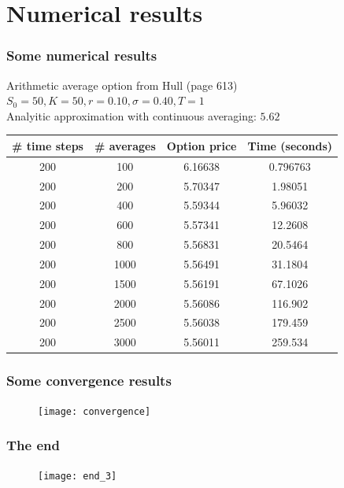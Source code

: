 \documentclass{beamer}
\begin{document}
\section{Numerical results}

\begin{frame}
\frametitle{Some numerical results}
\begin{center}
Arithmetic average option from Hull (page 613)\\
$S_0=50, K = 50, r = 0.10, \sigma = 0.40, T = 1$ \\
Analyitic approximation with continuous averaging: $5.62$
\end{center}

\begin{table}
\begin{tabular}{c c c c}
\toprule
\textbf{\# time steps} & \textbf{\# averages} & \textbf{Option price} & \textbf{Time (seconds)}\\
\midrule
200	&	100	&	6.16638	&	0.796763	\\
200	&	200	&	5.70347	&	1.98051	\\
200	&	400	&	5.59344	&	5.96032	\\
200	&	600	&	5.57341	&	12.2608	\\
200	&	800	&	5.56831	&	20.5464	\\
200	&	1000	&	5.56491	&	31.1804	\\
200	&	1500	&	5.56191	&	67.1026	\\
200	&	2000	&	5.56086	&	116.902	\\
200	&	2500	&	5.56038	&	179.459	\\
200	&	3000	&	5.56011	&	259.534	\\
\bottomrule
\end{tabular}
\end{table}
\end{frame}


\begin{frame}
\vspace*{-1cm}
\frametitle{Some convergence results}
\begin{figure}[t]
	\texttt{[image: convergence]}
\end{figure}
\end{frame}


\begin{frame}
\frametitle{The end}
\begin{figure}
	\texttt{[image: end\_3]}
\end{figure}
\end{frame}

\end{document}
